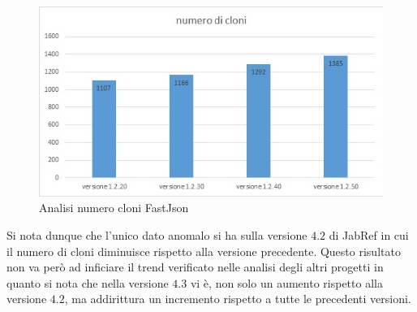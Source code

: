 \begin{figure}[h]
	\centering
	\includegraphics[scale=0.7, trim = 0cm 0cm 0cm 0cm, clip=true]{Grafici_fastJson/NumeroCloni.jpg}
	\caption{Analisi numero cloni FastJson}
	\label{fig:nCloniFastjson}
\end{figure}
Si nota dunque che l'unico dato anomalo si ha sulla versione $4.2$ di JabRef in cui il numero di cloni diminuisce rispetto alla versione precedente. Questo risultato non va però ad inficiare il trend verificato nelle analisi degli altri progetti in quanto si nota che nella versione $4.3$ vi è, non solo un aumento rispetto alla versione $4.2$, ma addirittura un incremento rispetto a tutte le precedenti versioni. 

